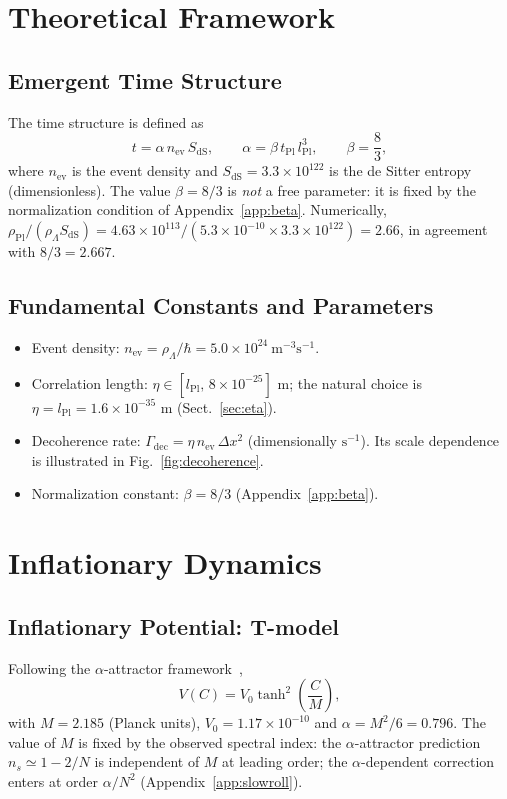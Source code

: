 \documentclass[11pt,a4paper]{article}
\begin{document}
\section{Theoretical Framework}
\subsection{Emergent Time Structure}
The time structure is defined as
\begin{equation}
t=\alpha\, n_{\mathrm{ev}}\, S_{\mathrm{dS}},\qquad
\alpha=\beta\, t_{\mathrm{Pl}}\, l_{\mathrm{Pl}}^{3},\qquad
\beta=\frac{8}{3},
\label{eq:time}
\end{equation}
where $n_{\mathrm{ev}}$ is the event density and
$S_{\mathrm{dS}}=3.3\times10^{122}$ is the de Sitter entropy
(dimensionless). The value $\beta=8/3$ is \emph{not} a free
parameter: it is fixed by the normalization condition of
Appendix~\ref{app:beta}. Numerically,
$\rho_{\mathrm{Pl}}/(\rho_{\Lambda}S_{\mathrm{dS}})
=4.63\times10^{113}/(5.3\times10^{-10}\times3.3\times10^{122})
=2.66$, in agreement with $8/3=2.667$.

\subsection{Fundamental Constants and Parameters}
\begin{itemize}
\item Event density: $n_{\mathrm{ev}}=\rho_{\Lambda}/\hbar
      =5.0\times10^{24}\ \mathrm{m^{-3}s^{-1}}$.
\item Correlation length: $\eta\in[l_{\mathrm{Pl}},\,8\times10^{-25}]$ m;
      the natural choice is $\eta=l_{\mathrm{Pl}}=1.6\times10^{-35}$ m
      (Sect.~\ref{sec:eta}).
\item Decoherence rate:
      $\Gamma_{\mathrm{dec}}=\eta\, n_{\mathrm{ev}}\,\Delta x^{2}$
      (dimensionally $\mathrm{s^{-1}}$). Its scale dependence is
      illustrated in Fig.~\ref{fig:decoherence}.
\item Normalization constant: $\beta=8/3$
      (Appendix~\ref{app:beta}).
\end{itemize}

\section{Inflationary Dynamics}
\subsection{Inflationary Potential: T-model}
Following the $\alpha$-attractor framework~\cite{KalloshLinde},
\begin{equation}
V(C)=V_{0}\tanh^{2}\!\left(\frac{C}{M}\right),
\label{eq:potential}
\end{equation}
with $M=2.185$ (Planck units), $V_{0}=1.17\times10^{-10}$ and
$\alpha=M^{2}/6=0.796$. The value of $M$ is fixed by the observed
spectral index: the $\alpha$-attractor prediction
$n_{s}\simeq1-2/N$ is independent of $M$ at leading order;
the $\alpha$-dependent correction enters at order $\alpha/N^{2}$
(Appendix~\ref{app:slowroll}).
\end{document}
